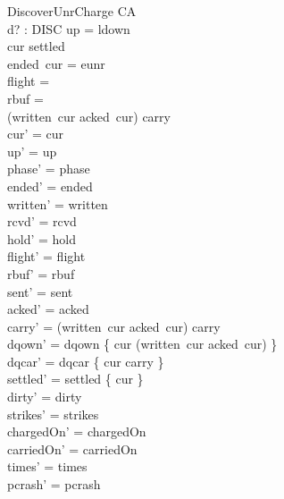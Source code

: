 \documentclass[a4paper,10pt,fleqn]{article}
\begin{document}
\begin{schema}{DiscoverUnrCharge}
  \Delta CA \\
  d? : DISC
\where
  up = ldown \\
  cur \notin settled \\
  ended~cur = eunr \\
  flight = \emptyset \\
  rbuf = \emptyset \\
  (written~cur \setminus acked~cur) \cup carry \neq \emptyset \\
  cur' = cur \\
  up' = up \\
  phase' = phase \\
  ended' = ended \\
  written' = written \\
  rcvd' = rcvd \\
  hold' = hold \\
  flight' = flight \\
  rbuf' = rbuf \\
  sent' = sent \\
  acked' = acked \\
  carry' = (written~cur \setminus acked~cur) \cup carry \\
  dqown' = dqown \cup \{ cur \mapsto (written~cur \setminus acked~cur) \} \\
  dqcar' = dqcar \cup \{ cur \mapsto carry \} \\
  settled' = settled \cup \{ cur \} \\
  dirty' = dirty \\
  strikes' = strikes \\
  chargedOn' = chargedOn \\
  carriedOn' = carriedOn \\
  times' = times \\
  pcrash' = pcrash
\end{schema}
\end{document}
